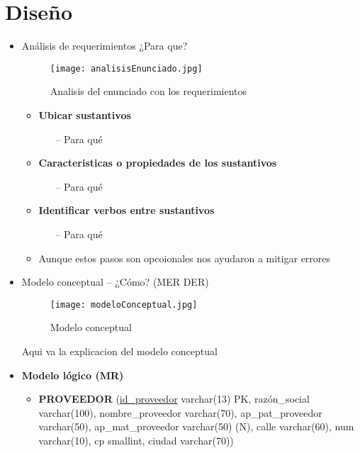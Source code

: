 \documentclass{article}
\begin{document}
\section*{Diseño}
\begin{itemize}
\item Análisis de requerimientos ¿Para que?
\begin{figure}[H]
  \centering
  \texttt{[image: analisisEnunciado.jpg]}
  \caption{Analisis del enunciado con los requerimientos}
  \label{fig:modeloconceptual}
\end{figure}
    \begin{itemize}
    \item \textbf{Ubicar sustantivos}
        \begin{itemize}
        \item[--] Para qué
        \end{itemize}
    \item \textbf{Caracteristicas o propiedades de los sustantivos}
        \begin{itemize}
        \item[--] Para qué
        \end{itemize}
    \item \textbf{Identificar verbos entre sustantivos}
        \begin{itemize}
        \item[--] Para qué
        \end{itemize}
    \item {Aunque estos pasos son opcoionales nos ayudaron a mitigar errores}

    \end{itemize}

\item Modelo conceptual -- ¿Cómo? (MER DER)
\begin{figure}[H]
  \centering
  \texttt{[image: modeloConceptual.jpg]}
  \caption{Modelo conceptual}
  \label{fig:modeloconceptual}
\end{figure}

Aqui va la explicacion del modelo conceptual

\item \textbf{Modelo lógico (MR)}
\begin{itemize}
    \item \textbf{PROVEEDOR} (\underline{id\_proveedor} varchar(13) PK, razón\_social varchar(100), nombre\_proveedor varchar(70), ap\_pat\_proveedor varchar(50), ap\_mat\_proveedor varchar(50) (N), calle varchar(60), num varchar(10), cp smallint, ciudad varchar(70))
    

\end{itemize}
\end{itemize}
\end{document}
